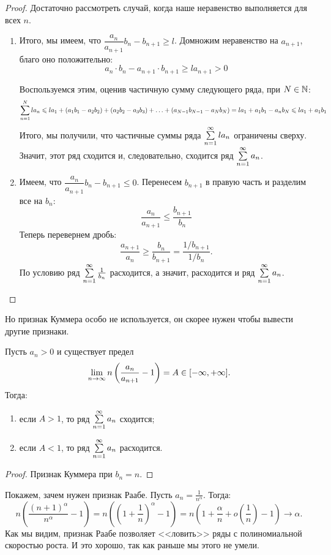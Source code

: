 \documentclass[a4paper, 12pt]{article}
\begin{document}
\begin{proof}
Достаточно рассмотреть случай, когда наше неравенство выполняется для всех $n$.
\begin{enumerate}
\item Итого, мы имеем, что $\dfrac{a_n}{a_{n+1}}b_n - b_{n+1} \geq l$. Домножим неравенство на $a_{n+1}$, благо оно положительно:
$$
a_n\cdot b_n - a_{n+1}\cdot b_{n+1} \geq la_{n+1} > 0
$$

Воспользуемся этим, оценив частичную сумму следующего ряда, при $N \in \mathbb{N}$:
$$
\sum\limits_{n=1}^{N} la_n \leqslant la_1 + (a_1b_1 - a_2b_2) + (a_2b_2 - a_3b_3) + \ldots + (a_{N-1}b_{N-1} - a_Nb_N)
= la_1 + a_1b_1 - a_nb_N \leqslant la_1 + a_1b_1
$$
Итого, мы получили, что частичные суммы ряда $\sum\limits_{n=1}^{\infty} la_n$ ограничены сверху. Значит, этот ряд сходится и, следовательно, сходится ряд $\sum\limits_{n=1}^{\infty}a_n$.

\item Имеем, что $\dfrac{a_n}{a_{n+1}}b_n - b_{n+1} \leq 0$. Перенесем $b_{n+1}$ в правую часть и разделим все на $b_n$:
$$
\frac{a_n}{a_{n+1}} \leq \frac{b_{n+1}}{b_n}
$$
Теперь перевернем дробь:
$$
\frac{a_{n+1}}{a_n} \geq \frac{b_n}{b_{n+1}} = \frac{1/ b_{n+1}}{1 / b_{n}}.
$$
По условию ряд $\sum\limits_{n=1}^{\infty}\frac{1}{b_n}$ расходится, а значит, расходится и ряд $\sum\limits_{n=1}^{\infty}a_n$.
\end{enumerate}
\end{proof}

Но признак Куммера особо не используется, он скорее нужен чтобы вывести другие признаки.
\begin{Test}
Пусть $a_n > 0$ и существует предел 
$$
\lim\limits_{n \rightarrow \infty} n \left( \dfrac{a_n}{a_{n+1}} - 1 \right) = A \in [-\infty, +\infty].
$$
Тогда:
\begin{enumerate}
\item если $A > 1$, то ряд $\sum\limits_{n=1}^{\infty}a_n$ сходится;
\item если $A < 1$, то ряд $\sum\limits_{n=1}^{\infty}a_n$ расходится.
\end{enumerate}
\end{Test}

\begin{proof}
Признак Куммера при $b_n = n$.
\end{proof}

Покажем, зачем нужен признак Раабе. Пусть $a_n = \frac{1}{n^\alpha}$. Тогда:
$$
n\left( \frac{(n+1)^\alpha}{n^{\alpha}} - 1 \right) = n\left( \left( 1 + \frac{1}{n} \right)^\alpha  - 1\right) = n\left( 1 + \frac{\alpha}{n} + o\left(\frac{1}{n}\right) - 1\right) \longrightarrow \alpha.
$$
Как мы видим, признак Раабе позволяет <<ловить>> ряды с полиномиальной скоростью роста. И это хорошо, так как раньше мы этого не умели.
\end{document}
